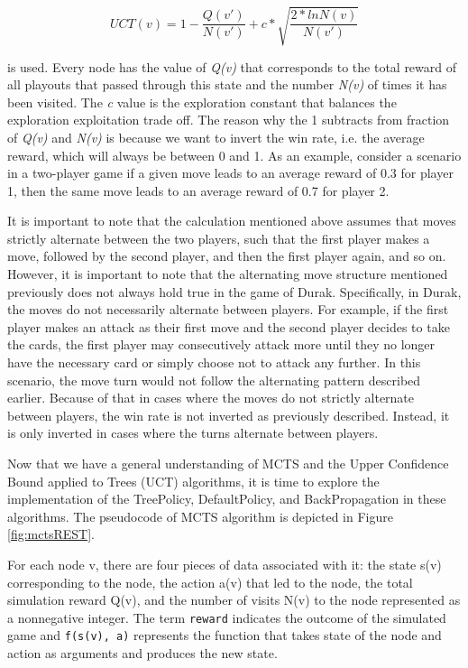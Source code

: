 \[ UCT(v) = 1 - \frac{Q(v')}{N(v')} + c*\sqrt{\frac{2 * ln{N(v)}}{N(v')}} \]

is used. Every node has the value of \textit{Q(v)} that corresponds to the total reward of all playouts that passed through this state and the number \textit{N(v)} of times it has been visited. The \textit{c} value is the exploration constant that balances the exploration exploitation trade off. The reason why the 1 subtracts from fraction of \textit{Q(v)} and \textit{N(v)} is because we want to invert the win rate, i.e. the average reward, which will always be between 0 and 1. As an example, consider a scenario in a two-player game if a given move leads to an average reward of 0.3 for player 1, then the same move leads to an average reward of 0.7 for player 2. 

It is important to note that the calculation mentioned above assumes that moves strictly alternate between the two players, such that the first player makes a move, followed by the second player, and then the first player again, and so on. However, it is important to note that the alternating move structure mentioned previously does not always hold true in the game of Durak. Specifically, in Durak, the moves do not necessarily alternate between players. For example, if the first player makes an attack as their first move and the second player decides to take the cards, the first player may consecutively attack more until they no longer have the necessary card or simply choose not to attack any further. In this scenario, the move turn would not follow the alternating pattern described earlier. Because of that in cases where the moves do not strictly alternate between players, the win rate is not inverted as previously described. Instead, it is only inverted in cases where the turns alternate between players.

Now that we have a general understanding of MCTS and the Upper Confidence Bound applied to Trees (UCT) algorithms, it is time to explore the implementation of the TreePolicy, DefaultPolicy, and BackPropagation in these algorithms. The pseudocode of MCTS algorithm is depicted in Figure  \ref{fig:mctsREST}. 

For each node v, there are four pieces of data associated with it: the state s(v) corresponding to the node, the action a(v) that led to the node, the total simulation reward Q(v), and the number of visits N(v) to the node represented as a nonnegative integer. The term \texttt{reward} indicates the outcome of the simulated game and \texttt{f(s(v), a)} represents the function that takes state of the node and action as arguments and produces the new state. 

